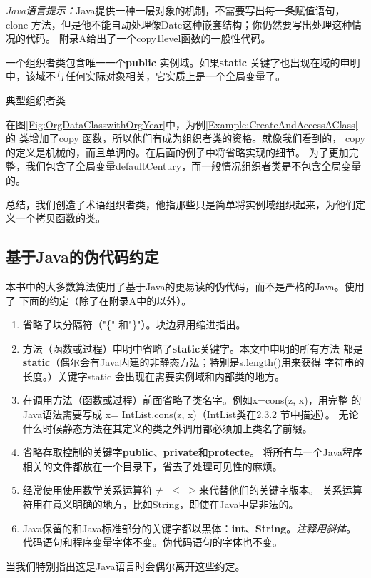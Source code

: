 \textit{Java语言提示：}Java提供一种一层对象的机制，不需要写出每一条赋值语句，clone
方法，但是他不能自动处理像Date这种嵌套结构；你仍然要写出处理这种情况的代码。
附录A给出了一个copy1level函数的一般性代码。

一个组织者类包含唯一一个\textbf{public} 实例域。如果\textbf{static}
关键字也出现在域的申明中，该域不与任何实际对象相关，它实质上是一个全局变量了。

\begin{example}
    典型组织者类

    在图\ref{Fig:OrgDataClasswithOrgYear}中，为例\ref{Example:CreateAndAccessAClass}的
    类增加了copy 函数，所以他们有成为组织者类的资格。就像我们看到的，
    copy的定义是机械的，而且单调的。在后面的例子中将省略实现的细节。
    为了更加完整，我们包含了全局变量defaultCentury，而一般情况组织者类是不包含全局变量的。
\end{example}

总结，我们创造了术语组织者类，他指那些只是简单将实例域组织起来，为他们定义一个拷贝函数的类。

\subsection{基于\textbf{Java}的伪代码约定}
本书中的大多数算法使用了基于Java的更易读的伪代码，而不是严格的Java。使用了
下面的约定（除了在附录A中的以外）。
\begin{enumerate}
    \item 省略了块分隔符（"\{" 和"\}"）。块边界用缩进指出。
    \item 方法（函数或过程）申明中省略了\textbf{static}关键字。本文中申明的所有方法
        都是\textbf{static}（偶尔会有Java内建的非静态方法；特别是s.length()用来获得
        字符串的长度。）关键字static 会出现在需要实例域和内部类的地方。
    \item 在调用方法（函数或过程）前面省略了类名字。例如x=cons(z, x)，用完整
        的Java语法需要写成 x= IntList.cons(z, x)（IntList类在2.3.2 节中描述）。
        无论什么时候静态方法在其定义的类之外调用都必须加上类名字前缀。
    \item 省略存取控制的关键字\textbf{public}、\textbf{private}和\textbf{protecte}。
        将所有与一个Java程序相关的文件都放在一个目录下，省去了处理可见性的麻烦。
    \item 经常使用使用数学关系运算符$\neq$ $\leq$ $\geq$来代替他们的关键字版本。
        关系运算符用在意义明确的地方，比如String，即使在Java中是非法的。
    \item Java保留的和Java标准部分的关键字都以黑体：\textbf{int}、\textbf{String}。\textit{注释用斜体}。
        代码语句和程序变量字体不变。伪代码语句的字体也不变。
\end{enumerate}
当我们特别指出这是Java语言时会偶尔离开这些约定。


